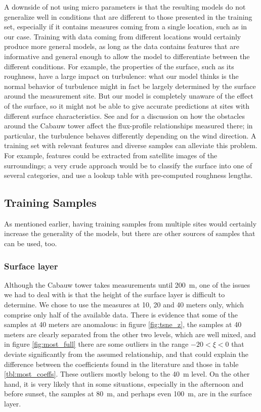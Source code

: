 \documentclass[a4paper,11pt]{kth-mag}
\begin{document}
A downside of not using micro parameters is that the resulting models do not generalize well in conditions that are different to those presented in the training set, especially if it contains measures coming from a single location, such as in our case. Training with data coming from different locations would certainly produce more general models, as long as the data contains features that are informative and general enough to allow the model to differentiate between the different conditions. For example, the properties of the surface, such as its roughness, have a large impact on turbulence: what our model thinks is the normal behavior of turbulence might in fact be largely determined by the surface around the measurement site. But our model is completely unaware of the effect of the surface, so it might not be able to give accurate predictions at sites with different surface characteristics. See \cite{cabauw_surface} and \cite{cabauw_z0} for a discussion on how the obstacles around the Cabauw tower affect the flux-profile relationships measured there; in particular, the turbulence behaves differently depending on the wind direction. A training set with relevant features and diverse samples can alleviate this problem. For example, features could be extracted from satellite images of the surroundings; a very crude approach would be to classify the surface into one of several categories, and use a lookup table with pre-computed roughness lengths.


\subsection{Training Samples}
As mentioned earlier, having training samples from multiple sites would certainly increase the generality of the models, but there are other sources of samples that can be used, too.

\subsubsection{Surface layer} Although the Cabauw tower takes measurements until \SI{200}{\meter}, one of the issues we had to deal with is that the height of the surface layer is difficult to determine. We chose to use the measures at 10, 20 and 40 meters only, which comprise only half of the available data. There is evidence that some of the samples at 40 meters are anomalous: in figure \ref{fig:tsne_z}, the samples at 40 meters are clearly separated from the other two levels, which are well mixed, and in figure \ref{fig:most_full} there are some outliers in the range $-20<\xi<0$ that deviate significantly from the assumed relationship, and that could explain the difference between the coefficients found in the literature and those in table \ref{tbl:most_coeffs}. These outliers mostly belong to the \SI{40}{\meter} level. On the other hand, it is very likely that in some situations, especially in the afternoon and before sunset, the samples at \SI{80}{\meter}, and perhaps even \SI{100}{\meter}, are in the surface layer.
\end{document}
